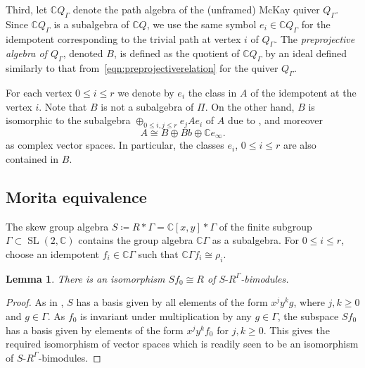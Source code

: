\documentclass[10pt,a4paper]{amsart}
\newtheorem{Lemma}[Theorem]{Lemma}
\newcommand{\SC}{\mathbb{C}} %
\newcommand{\SL}{\operatorname{SL}}
\newcommand{\PiGamma}{B}
\newcommand{\PiQ}{A}
\numberwithin{equation}{section}
\begin{document}
 Third, let $\SC Q_\Gamma$ denote the path algebra of the (unframed) McKay quiver $Q_\Gamma$. Since $\SC Q_\Gamma$ is a subalgebra of $\SC Q$, we use the same symbol $e_i\in \SC Q_\Gamma$ for the idempotent corresponding to the trivial path at vertex $i$ of $Q_\Gamma$. The \emph{preprojective algebra of $Q_\Gamma$}, denoted $\PiGamma$, is defined as the quotient of $\SC Q_\Gamma$ by an ideal defined similarly to that from~\eqref{eqn:preprojectiverelation} for the quiver $Q_\Gamma$.

\begin{Remark}
 For each vertex $0\leq i\leq r$ we denote by $e_i$ the class in $\PiQ$ of the idempotent at the vertex $i$. Note that $\PiGamma$ is not a subalgebra of $\Pi$. On the other hand, $\PiGamma$ is isomorphic to the subalgebra $\oplus_{0 \leq i,j \leq r} e_j\PiQ e_i$ of $\PiQ$ due to \cite[Lemma~3.2]{craw2019punctual}, and moreover
 \begin{equation} \label{eq:PiQdecomp}
 \PiQ \cong \PiGamma \oplus \PiGamma b \oplus \SC e_\infty.
\end{equation}
as complex vector spaces. In particular, the classes $e_i$, $0 \leq i \leq r$ are also contained in $\PiGamma$.
\end{Remark}

\subsection{Morita equivalence}
The skew group algebra $S \coloneqq R \ast \Gamma=\SC[x,y]\ast \Gamma$ of the finite subgroup $\Gamma\subset \SL(2,\SC)$ contains the group algebra $\SC\Gamma$ as a subalgebra. For $0\leq i\leq r$, choose an idempotent $f_i\in \mathbb{C}\Gamma$ such that $\mathbb{C}\Gamma f_i\cong \rho_i$.

\begin{Lemma}\label{lem:polyring}
There is an isomorphism $S f_0 \cong R$ of $S\text{-}R^\Gamma$-bimodules.
\end{Lemma}
\begin{proof}
As in \cite[Lemma~1.1]{crawley1998noncommutative}, $S$ has a basis given by all elements of the form $x^jy^kg$, where $j,k \geq 0$ and $g \in \Gamma$. As $f_0$ is invariant under multiplication by any $g \in \Gamma$, the subspace $Sf_0$ has a basis given by elements of the form $x^jy^kf_0$ for $j,k \geq 0$. This gives the required isomorphism
of vector spaces which is readily seen to be an isomorphism of $S\text{-}R^\Gamma$-bimodules.
\end{proof}
\end{document}
